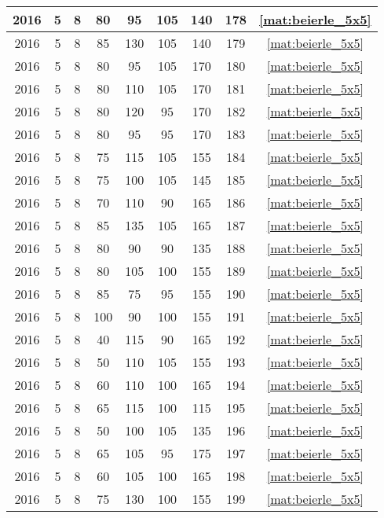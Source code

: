\begin{longtable}{|c|c|c|c|c|c|c|c|c|}
2016 & 5 & 8 & 80 & 95 & 105 & 140 & 178 & \eqref{mat:beierle_5x5} \\ \hline 
2016 & 5 & 8 & 85 & 130 & 105 & 140 & 179 & \eqref{mat:beierle_5x5} \\ \hline 
2016 & 5 & 8 & 80 & 95 & 105 & 170 & 180 & \eqref{mat:beierle_5x5} \\ \hline 
2016 & 5 & 8 & 80 & 110 & 105 & 170 & 181 & \eqref{mat:beierle_5x5} \\ \hline 
2016 & 5 & 8 & 80 & 120 & 95 & 170 & 182 & \eqref{mat:beierle_5x5} \\ \hline 
2016 & 5 & 8 & 80 & 95 & 95 & 170 & 183 & \eqref{mat:beierle_5x5} \\ \hline 
2016 & 5 & 8 & 75 & 115 & 105 & 155 & 184 & \eqref{mat:beierle_5x5} \\ \hline 
2016 & 5 & 8 & 75 & 100 & 105 & 145 & 185 & \eqref{mat:beierle_5x5} \\ \hline 
2016 & 5 & 8 & 70 & 110 & 90 & 165 & 186 & \eqref{mat:beierle_5x5} \\ \hline 
2016 & 5 & 8 & 85 & 135 & 105 & 165 & 187 & \eqref{mat:beierle_5x5} \\ \hline 
2016 & 5 & 8 & 80 & 90 & 90 & 135 & 188 & \eqref{mat:beierle_5x5} \\ \hline 
2016 & 5 & 8 & 80 & 105 & 100 & 155 & 189 & \eqref{mat:beierle_5x5} \\ \hline 
2016 & 5 & 8 & 85 & 75 & 95 & 155 & 190 & \eqref{mat:beierle_5x5} \\ \hline 
2016 & 5 & 8 & 100 & 90 & 100 & 155 & 191 & \eqref{mat:beierle_5x5} \\ \hline 
2016 & 5 & 8 & 40 & 115 & 90 & 165 & 192 & \eqref{mat:beierle_5x5} \\ \hline 
2016 & 5 & 8 & 50 & 110 & 105 & 155 & 193 & \eqref{mat:beierle_5x5} \\ \hline 
2016 & 5 & 8 & 60 & 110 & 100 & 165 & 194 & \eqref{mat:beierle_5x5} \\ \hline 
2016 & 5 & 8 & 65 & 115 & 100 & 115 & 195 & \eqref{mat:beierle_5x5} \\ \hline 
2016 & 5 & 8 & 50 & 100 & 105 & 135 & 196 & \eqref{mat:beierle_5x5} \\ \hline 
2016 & 5 & 8 & 65 & 105 & 95 & 175 & 197 & \eqref{mat:beierle_5x5} \\ \hline 
2016 & 5 & 8 & 60 & 105 & 100 & 165 & 198 & \eqref{mat:beierle_5x5} \\ \hline 
2016 & 5 & 8 & 75 & 130 & 100 & 155 & 199 & \eqref{mat:beierle_5x5} \\ \hline 

\end{longtable}
